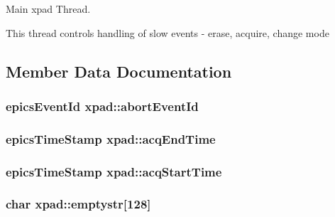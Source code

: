 \-Main xpad \-Thread. 

\-This thread controls handling of slow events -\/ erase, acquire, change mode 

\subsection{\-Member \-Data \-Documentation}
\hypertarget{classxpad_a368f42021436284673610b452e0b1d86}{
\subsubsection[{abort\-Event\-Id}]{\setlength{\rightskip}{0pt plus 5cm}epics\-Event\-Id {\bf xpad\-::abort\-Event\-Id}}}\label{classxpad_a368f42021436284673610b452e0b1d86}
\hypertarget{classxpad_af7d78280f3004beb8930b19bba9a206f}{
\subsubsection[{acq\-End\-Time}]{\setlength{\rightskip}{0pt plus 5cm}epics\-Time\-Stamp {\bf xpad\-::acq\-End\-Time}}}\label{classxpad_af7d78280f3004beb8930b19bba9a206f}
\hypertarget{classxpad_a9abf8c53880f5277a9c8a62074a3709a}{
\subsubsection[{acq\-Start\-Time}]{\setlength{\rightskip}{0pt plus 5cm}epics\-Time\-Stamp {\bf xpad\-::acq\-Start\-Time}}}\label{classxpad_a9abf8c53880f5277a9c8a62074a3709a}
\hypertarget{classxpad_a421021783f2a42b2006d47747670b90a}{
\subsubsection[{emptystr}]{\setlength{\rightskip}{0pt plus 5cm}char {\bf xpad\-::emptystr}\mbox{[}128\mbox{]}}}\label{classxpad_a421021783f2a42b2006d47747670b90a}
